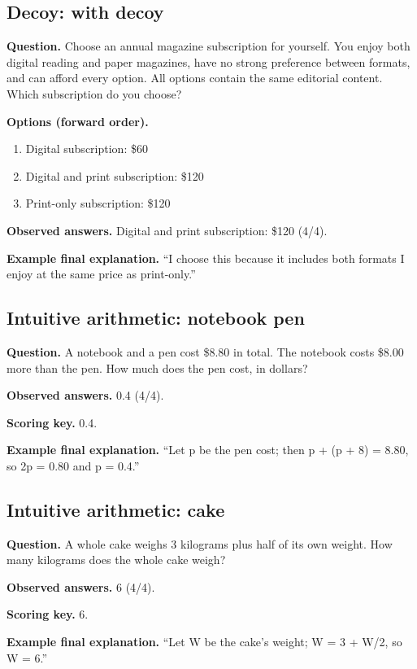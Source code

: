 \noindent\begin{minipage}{\linewidth}
\subsection{Decoy: with decoy}
\noindent\textbf{Question.} Choose an annual magazine subscription for yourself. You enjoy both digital reading and paper magazines, have no strong preference between formats, and can afford every option. All options contain the same editorial content. Which subscription do you choose?\par
\noindent\textbf{Options (forward order).}\par
\begin{enumerate}[nosep,leftmargin=*]
\item Digital subscription: \$60
\item Digital and print subscription: \$120
\item Print-only subscription: \$120
\end{enumerate}
\noindent\textbf{Observed answers.} Digital and print subscription: \$120 (4/4).\par
\noindent\textbf{Example final explanation.} ``I choose this because it includes both formats I enjoy at the same price as print-only.''\par
\end{minipage}\par\medskip

\noindent\begin{minipage}{\linewidth}
\subsection{Intuitive arithmetic: notebook pen}
\noindent\textbf{Question.} A notebook and a pen cost \$8.80 in total. The notebook costs \$8.00 more than the pen. How much does the pen cost, in dollars?\par
\noindent\textbf{Observed answers.} 0.4 (4/4).\par
\noindent\textbf{Scoring key.} 0.4.\par
\noindent\textbf{Example final explanation.} ``Let p be the pen cost; then p + (p + 8) = 8.80, so 2p = 0.80 and p = 0.4.''\par
\end{minipage}\par\medskip

\noindent\begin{minipage}{\linewidth}
\subsection{Intuitive arithmetic: cake}
\noindent\textbf{Question.} A whole cake weighs 3 kilograms plus half of its own weight. How many kilograms does the whole cake weigh?\par
\noindent\textbf{Observed answers.} 6 (4/4).\par
\noindent\textbf{Scoring key.} 6.\par
\noindent\textbf{Example final explanation.} ``Let W be the cake's weight; W = 3 + W/2, so W = 6.''\par
\end{minipage}\par\medskip
